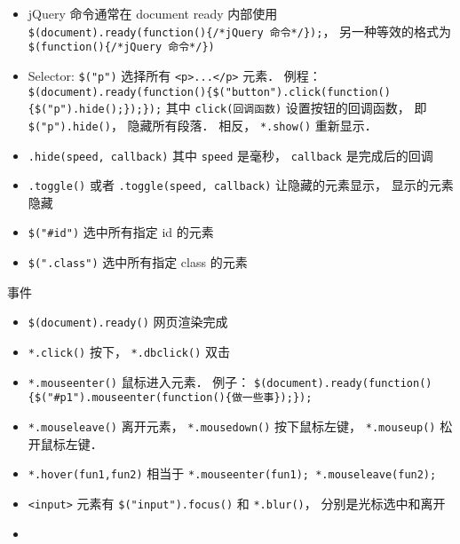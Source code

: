 

\begin{itemize}
\item jQuery 命令通常在 document ready 内部使用 \verb|$(document).ready(function(){/*jQuery 命令*/});|， 另一种等效的格式为 \verb|$(function(){/*jQuery 命令*/})|
\item Selector: \verb|$("p")| 选择所有 \verb|<p>...</p>| 元素． 例程： \verb|$(document).ready(function(){$("button").click(function(){$("p").hide();});});| 其中 \verb|click(回调函数)| 设置按钮的回调函数， 即 \verb|$("p").hide()|， 隐藏所有段落． 相反， \verb|*.show()| 重新显示．
\item \verb|.hide(speed, callback)| 其中 \verb|speed| 是毫秒， \verb|callback| 是完成后的回调
\item \verb|.toggle()| 或者 \verb|.toggle(speed, callback)| 让隐藏的元素显示， 显示的元素隐藏
\item \verb|$("#id")| 选中所有指定 id 的元素
\item \verb|$(".class")| 选中所有指定 class 的元素
\end{itemize}

事件
\begin{itemize}
\item \verb|$(document).ready()| 网页渲染完成
\item \verb|*.click()| 按下， \verb|*.dbclick()| 双击
\item \verb|*.mouseenter()| 鼠标进入元素． 例子： \verb|$(document).ready(function(){$("#p1").mouseenter(function(){做一些事});});|
\item \verb|*.mouseleave()| 离开元素， \verb|*.mousedown()| 按下鼠标左键， \verb|*.mouseup()| 松开鼠标左键．
\item \verb|*.hover(fun1,fun2)| 相当于 \verb|*.mouseenter(fun1); *.mouseleave(fun2);|
\item \verb|<input>| 元素有 \verb|$("input").focus()| 和 \verb|*.blur()|， 分别是光标选中和离开
\item 
\end{itemize}
